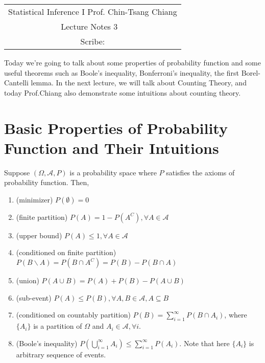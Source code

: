 \documentclass[Probability_Theory.tex]{subfiles}
\begin{document}
	\begin{center}
		\renewcommand{\arraystretch}{2}
		\begin{bfseries}
			\begin{tabular}{|c|}
				\hline
				Statistical Inference I \hfill Prof. Chin-Tsang Chiang\\
				\hspace{15em} {\large Lecture Notes 3} \hspace{15em}\ \\
				\lecdate \hfill Scribe: \scribe\\
				\hline
			\end{tabular}
			\renewcommand{\arraystretch}{1}
		\end{bfseries}
	\end{center}
Today we're going to talk about some properties of probability function and some useful theorems such as Boole's inequality, Bonferroni's inequality, the first Borel-Cantelli lemma. In the next lecture, we will talk about Counting Theory, and today Prof.Chiang also demonstrate some intuitions about counting theory.

\section{Basic Properties of Probability Function and Their Intuitions}
\begin{theorem}
	Suppose $(\Omega,\mathcal{A},P)$ is a probability space where $P$ satisfies the axioms of probability function. Then,
	\begin{enumerate}
		\item (minimizer) $P(\emptyset) = 0$
		\item (finite partition) $P(A) = 1-P(A^C), \forall A\in\mathcal{A}$
		\item (upper bound) $P(A)\leq1, \forall A\in\mathcal{A}$
		\item (conditioned on finite partition) $P(B\backslash A) = P(B\cap A^C) = P(B) - P(B\cap A)$
		\item (union) $P(A\cup B) = P(A) + P(B) - P(A\cup B)$
		\item (sub-event) $P(A)\leq P(B),\forall A,B\in\mathcal{A},A\subseteq B$
		\item (conditioned on countably partition) $P(B) = \sum_{i=1}^{\infty} P(B\cap A_i)$, where $\{A_i\}$ is a partition of $\Omega$ and $A_i\in\mathcal{A},\forall i$.
		\item (Boole's inequality) $P(\bigcup_{i=1}^{\infty}A_i)\leq\sum_{i=1}^{\infty}P(A_i)$. Note that here $\{A_i\}$ is arbitrary sequence of events.
	\end{enumerate}
\end{theorem}
\end{document}
